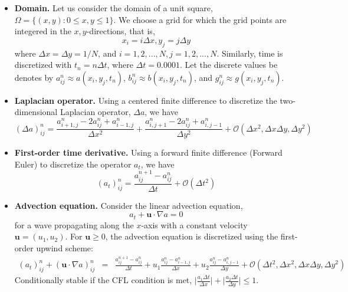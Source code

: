 \documentclass[11pt]{article}
\renewcommand{\vec}[1]{\bm{#1}}                 %
\begin{document}
\begin{itemize}
\item \textbf{Domain.} Let us consider the domain of a unit square, $\Omega = \{(x,y): 0\leq x, y \leq 1\}$. We choose a grid for which the grid points are integered in the $x,y$-directions, that is,
$$x_i = i \Delta x, y_j = j \Delta y$$
where $\Delta x = \Delta y = 1/N$, and $i = 1,2,...,N, j=1,2,...,N$. Similarly, time is discretized with $t_n = n \Delta t$, where $\Delta t = 0.0001$. Let the discrete values be denotes by $a^n_{ij} \approx a(x_i,y_j,t_n)$, $b^n_{ij} \approx b(x_i,y_j,t_n)$, and $g^n_{ij} \approx g(x_i,y_j,t_n)$.

\item \textbf{Laplacian operator.} Using a centered finite difference to discretize the two-dimensional Laplacian operator, $\Delta a$, we have
$$(\Delta a)^n_{ij} = \frac{a^n_{i+1,j} - 2 a^n_{ij} + a^n_{i-1,j}}{\Delta x^2} + \frac{a^n_{i,j+1} - 2 a^n_{ij} + a^n_{i,j-1}}{\Delta y^2} + \mathcal{O}{(\Delta x^2, \Delta x \Delta y, \Delta y^2)}$$

\item \textbf{First-order time derivative.} Using a forward finite difference (Forward Euler) to discretize the operator $a_t$, we have
$$(a_t)^n_{ij} = \frac{a^{n+1}_{ij} - a^n_{ij}}{\Delta t} + \mathcal{O}{(\Delta t^2)}$$

\item \textbf{Advection equation.} Consider the linear advection equation,
$$a_t + \vec{u} \cdot \nabla{a} = 0$$
for a wave propagating along the $x$-axis with a constant velocity $\vec{u} = (u_1,u_2)$.
For $\vec{u} \geq 0$, the advection equation is discretized using the first-order upwind scheme:
\begin{eqnarray*}(a_t)^n_{ij} + (\vec{u} \cdot \nabla a)^n_{ij} &=& \frac{a^{n+1}_{ij} - a^n_{ij}}{\Delta t} + u_1 \frac{a^n_{ij}-a^n_{i-1,j}}{\Delta x} + u_2 \frac{a^n_{ij}-a^n_{i,j-1}}{\Delta y} + \mathcal{O}{(\Delta t^2, \Delta x^2, \Delta x \Delta y, \Delta y^2)}
\end{eqnarray*}
Conditionally stable if the CFL condition is met, $\Big| \frac{a_1 \Delta t}{\Delta x} \Big| + \Big| \frac{a_2 \Delta t}{\Delta y} \Big| \leq 1$.
\end{itemize}
\end{document}
